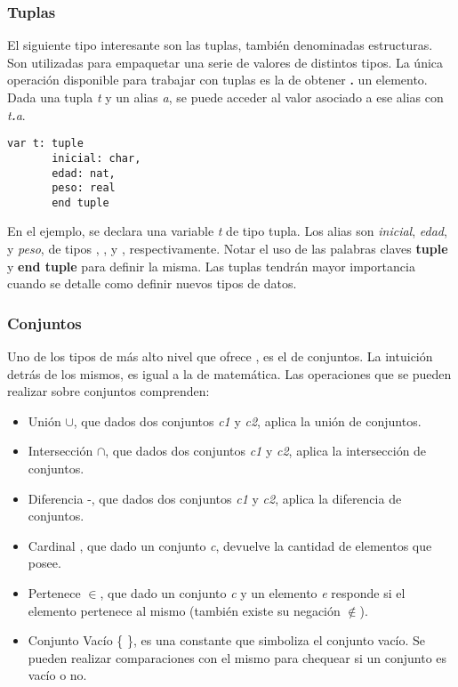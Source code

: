 \documentclass{article}
\begin{document}
\subsubsection{Tuplas}

El siguiente tipo interesante son las tuplas, también denominadas estructuras.
Son utilizadas para empaquetar una serie de valores de distintos tipos.
La única operación disponible para trabajar con tuplas es la de obtener \textbf{.} un elemento.
Dada una tupla \textit{t} y un alias \textit{a}, se puede acceder al valor asociado a ese alias con \textit{t\textbf{.}a}.

\begin{lstlisting}
var t: tuple
       inicial: char,
       edad: nat,
       peso: real
       end tuple
\end{lstlisting}

En el ejemplo, se declara una variable \textit{t} de tipo tupla.
Los alias son \textit{inicial}, \textit{edad}, y \textit{peso}, de tipos , , y , respectivamente.
Notar el uso de las palabras claves \textbf{tuple} y \textbf{end tuple} para definir la misma.
Las tuplas tendrán mayor importancia cuando se detalle como definir nuevos tipos de datos.

\subsubsection{Conjuntos}

Uno de los tipos de más alto nivel que ofrece \Lang, es el de conjuntos.
La intuición detrás de los mismos, es igual a la de matemática.
Las operaciones que se pueden realizar sobre conjuntos comprenden:

\begin{itemize}
\item Unión $\cup$, que dados dos conjuntos \textit{c1} y \textit{c2}, aplica la unión de conjuntos.
\item Intersección $\cap$, que dados dos conjuntos \textit{c1} y \textit{c2}, aplica la intersección de conjuntos.
\item Diferencia -, que dados dos conjuntos \textit{c1} y \textit{c2}, aplica la diferencia de conjuntos.
\item Cardinal \card, que dado un conjunto \textit{c}, devuelve la cantidad de elementos que posee.
\item Pertenece $\in$, que dado un conjunto \textit{c} y un elemento \textit{e} responde si el elemento pertenece al mismo (también existe su negación $\notin$).
\item Conjunto Vacío \{ \}, es una constante que simboliza el conjunto vacío.
Se pueden realizar comparaciones con el mismo para chequear si un conjunto es vacío o no.
\end{itemize}
\end{document}

